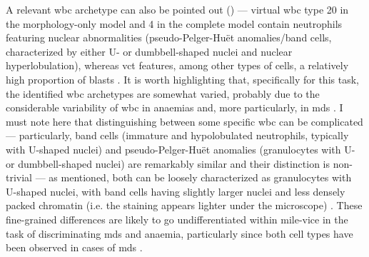 \begin{figure}[!ht]
    \label{fig:rbc-disease-detection-examples}
\end{figure}

A relevant \ac{wbc} archetype can also be pointed out () --- virtual \ac{wbc} type 20 in the morphology-only model and 4 in the complete model contain neutrophils featuring nuclear abnormalities (pseudo-Pelger-Huët anomalies/band cells, characterized by either U- or dumbbell-shaped nuclei \cite{Bain2005-zg} and nuclear hyperlobulation), whereas \ac{vct} features, among other types of cells, a relatively high proportion of blasts . It is worth highlighting that, specifically for this task, the identified \ac{wbc} archetypes are somewhat varied, probably due to the considerable variability of \ac{wbc} in anaemias and, more particularly, in \ac{mds} \cite{Bain2005-zg,Bain2014-oc}. I must note here that distinguishing between some specific \ac{wbc} can be complicated --- particularly, band cells (immature and hypolobulated neutrophils, typically with U-shaped nuclei) and pseudo-Pelger-Huët anomalies (granulocytes with U- or dumbbell-shaped nuclei) are remarkably similar and their distinction is non-trivial --- as mentioned, both can be loosely characterized as granulocytes with U-shaped nuclei, with band cells having slightly larger nuclei and less densely packed chromatin (i.e. the staining appears lighter under the microscope) \cite{Colella2012-so}. These fine-grained differences are likely to go undifferentiated within \ac{mile-vice} in the task of discriminating \ac{mds} and anaemia, particularly since both cell types have been observed in cases of \ac{mds} \cite{Davey1988-zn,Cunningham1995-pc}.

\begin{figure}[!ht]
    \label{fig:wbc-disease-detection-examples}
\end{figure}

